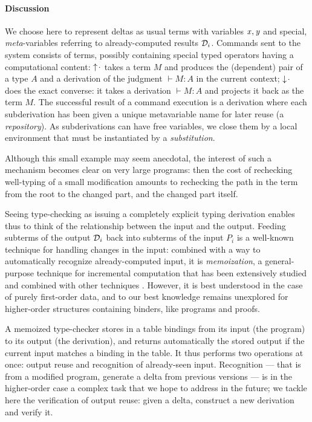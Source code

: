 \documentclass[9pt]{sigplanconf}
\begin{document}
\paragraph{Discussion}

We choose here to represent deltas as usual terms with variables $\text{\textit{x}}, \text{\textit{y}}$ and special, \emph{meta}-variables referring to
already-computed results $\mathcal D_i$. Commands sent to the system consists
of terms, possibly containing special typed operators having a
computational content: $\uparrow\!{\cdot}$ takes a term $M$ and produces
the (dependent) pair of a type $A$ and a derivation of the judgment
$\vdash M:A$ in the current context; $\downarrow\!{\cdot}$ does the exact
converse: it takes a derivation $\vdash M:A$ and projects it back as
the term $M$. The successful result of a command execution is a
derivation where each subderivation has been given a unique
metavariable name for later reuse (a \emph{repository}). As
subderivations can have free variables, we close them by a local
environment that must be instantiated by a \emph{substitution}.

Although this small example may seem anecdotal, the interest of such a
mechanism becomes clear on very large programs: then the cost of
rechecking well-typing of a small modification amounts to rechecking
the path in the term from the root to the changed part, and the
changed part itself.


Seeing type-checking as issuing a completely explicit typing
derivation enables thus to think of the relationship between the input
and the output. Feeding subterms of the output $\mathcal D_i$ back into
subterms of the input $P_i$ is a well-known technique for handling
changes in the input: combined with a way to automatically recognize
already-computed input, it is \emph{memoization}, a general-purpose
technique for incremental computation that has been extensively
studied and combined with other techniques \cite{pugh1989incremental,
  acar2003selective}. However, it is best understood in the case of
purely first-order data, and to our best knowledge remains unexplored
for higher-order structures containing binders, like programs and
proofs.

A memoized type-checker stores in a table bindings from its input (the
program) to its output (the derivation), and returns automatically the
stored output if the current input matches a binding in the table. It
thus performs two operations at once: output reuse and recognition of
already-seen input. Recognition --- that is from a modified program,
generate a delta from previous versions --- is in the higher-order
case a complex task that we hope to address in the future; we tackle
here the verification of output reuse: given a delta, construct a new
derivation and verify it.
\end{document}
